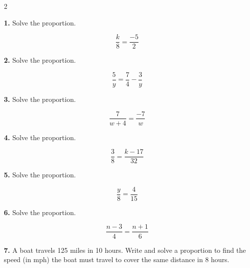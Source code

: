 \documentclass[11pt]{article}
\newcommand{\workspace}[1][3.5cm]{\vspace{#1}}
\begin{document}
\vspace{0.4cm}
\begin{multicols}{2}

\textbf{1.} \; Solve the proportion.

\[
  \frac{k}{8} = \frac{-5}{2}
\]

\workspace[3cm]

\textbf{2.} \; Solve the proportion.

\[
  \frac{5}{y} = \frac{7}{4} - \frac{3}{y}
\]

\workspace[3cm]

\textbf{3.} \; Solve the proportion.

\[
  \frac{7}{w+4} = \frac{-7}{w}
\]

\workspace[3cm]

\textbf{4.} \; Solve the proportion.

\[
  \frac{3}{8} = \frac{k - 17}{32}
\]

\workspace[3cm]

\textbf{5.} \; Solve the proportion.

\[
  \frac{y}{8} = \frac{4}{15}
\]

\workspace[3cm]

\textbf{6.} \; Solve the proportion.

\[
  \frac{n-3}{4} = \frac{n+1}{6}
\]

\workspace[3cm]

\textbf{7.} \; A boat travels 125 miles in 10 hours. Write and solve a
proportion to find the speed (in mph) the boat must travel to cover
the same distance in 8 hours.


\end{multicols}
\end{document}
